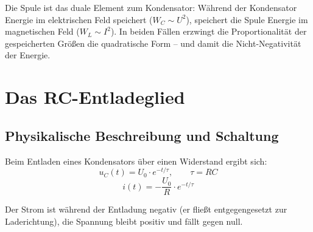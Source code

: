 ﻿\documentclass[12pt, a4paper]{article}
\begin{document}
	Die Spule ist das duale Element zum Kondensator: Während der Kondensator Energie im elektrischen Feld speichert ($W_C \sim U^2$), speichert die Spule Energie im magnetischen Feld ($W_L \sim I^2$). In beiden Fällen erzwingt die Proportionalität der gespeicherten Größen die quadratische Form -- und damit die Nicht-Negativität der Energie.
	
	\section{Das RC-Entladeglied}
	
	\subsection{Physikalische Beschreibung und Schaltung}
	
	Beim Entladen eines Kondensators über einen Widerstand ergibt sich:
	\begin{equation}
		u_C(t) = U_0 \cdot e^{-t/\tau}, \qquad \tau = RC
	\end{equation}
	\begin{equation}
		i(t) = -\frac{U_0}{R} \cdot e^{-t/\tau}
	\end{equation}
	
	Der Strom ist während der Entladung negativ (er fließt entgegengesetzt zur Laderichtung), die Spannung bleibt positiv und fällt gegen null.
	
\end{document}

